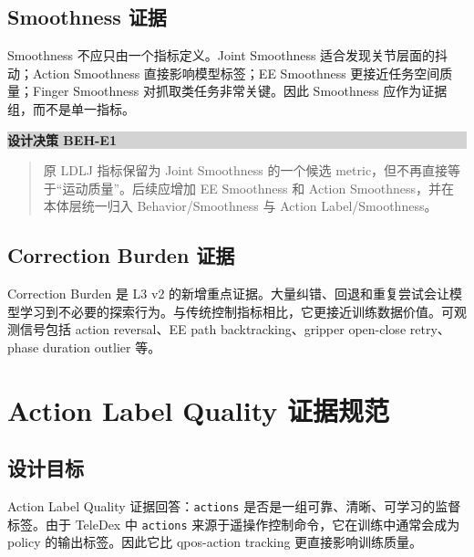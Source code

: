 \documentclass[UTF8,zihao=-4]{ctexart}
\newcommand{\Code}[1]{\texttt{#1}}
\newenvironment{decisionbox}[1]{\vspace{0.5em}\noindent\colorbox{LightGray}{\parbox{0.96\linewidth}{\textbf{#1}}}\par\vspace{-0.2em}\begin{quote}\small}{\end{quote}\vspace{0.3em}}
\begin{document}
\subsection{Smoothness 证据}

Smoothness 不应只由一个指标定义。Joint Smoothness 适合发现关节层面的抖动；Action Smoothness 直接影响模型标签；EE Smoothness 更接近任务空间质量；Finger Smoothness 对抓取类任务非常关键。因此 Smoothness 应作为证据组，而不是单一指标。

\begin{decisionbox}{设计决策 BEH-E1}
原 LDLJ 指标保留为 Joint Smoothness 的一个候选 metric，但不再直接等于“运动质量”。后续应增加 EE Smoothness 和 Action Smoothness，并在本体层统一归入 Behavior/Smoothness 与 Action Label/Smoothness。
\end{decisionbox}

\subsection{Correction Burden 证据}

Correction Burden 是 L3 v2 的新增重点证据。大量纠错、回退和重复尝试会让模型学习到不必要的探索行为。与传统控制指标相比，它更接近训练数据价值。可观测信号包括 action reversal、EE path backtracking、gripper open-close retry、phase duration outlier 等。

\section{Action Label Quality 证据规范}

\subsection{设计目标}

Action Label Quality 证据回答：\Code{actions} 是否是一组可靠、清晰、可学习的监督标签。由于 TeleDex 中 \Code{actions} 来源于遥操作控制命令，它在训练中通常会成为 policy 的输出标签。因此它比 qpos-action tracking 更直接影响训练质量。
\end{document}
